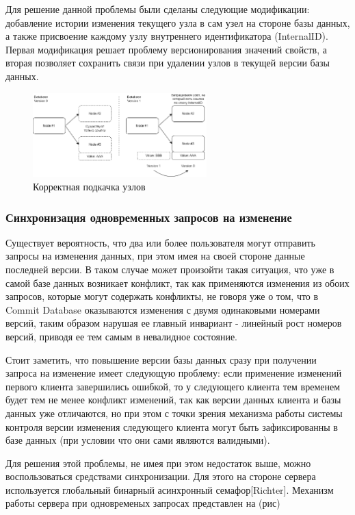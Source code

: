\documentclass[12pt]{article}
\begin{document}
Для решение данной проблемы были сделаны следующие модификации: добавление истории изменения текущего узла в сам узел на стороне базы данных, а также присвоение каждому узлу внутреннего идентификатора (InternalID). Первая модификация решает проблему версионирования значений свойств, а вторая позволяет сохранить связи при удалении узлов в текущей версии базы данных.

\begin{figure}[!ht]
    \centering
    \includegraphics[width=0.6\textwidth]{_images/good_node_pooling.png}
    \caption{Корректная подкачка узлов}
\end{figure}

\subsubsection{Синхронизация одновременных запросов на изменение}
\qquad Существует вероятность, что два или более пользователя могут отправить запросы на изменения данных, при этом имея на своей стороне данные последней версии. В таком случае может произойти такая ситуация, что уже в самой базе данных возникает конфликт, так как применяются изменения из обоих запросов, которые могут содержать конфликты, не говоря уже о том, что в Commit Database оказываются изменения с двумя одинаковыми номерами версий, таким образом нарушая ее главный инвариант - линейный рост номеров версий, приводя ее тем самым в невалидное состояние.

Стоит заметить, что повышение версии базы данных сразу при получении запроса на изменение имеет следующую проблему: если применение изменений первого клиента завершились ошибкой, то у следующего клиента тем временем будет тем не менее конфликт изменений, так как версии данных клиента и базы данных уже отличаются, но при этом с точки зрения механизма работы системы контроля версии изменения следующего клиента могут быть зафиксированны в базе данных (при условии что они сами являются валидными).

Для решения этой проблемы, не имея при этом недостаток выше, можно воспользоваться средствами синхронизации. Для этого на стороне сервера используется глобальный бинарный асинхронный семафор[Richter]. Механизм работы сервера при одновременых запросах представлен на (рис)
\end{document}
